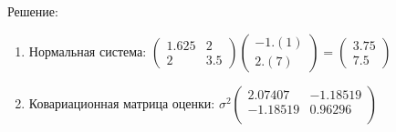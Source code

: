 \documentclass[a4paper,12pt]{article}
\begin{document}
\begin{enumerate}
            Решение:
            \begin{enumerate}
                  \item Нормальная система:
                        $
                              \begin{pmatrix}
                                    1.625 & 2   \\
                                    2     & 3.5
                              \end{pmatrix}
                              \begin{pmatrix}
                                    -1.(1) \\
                                    2.(7)
                              \end{pmatrix}
                              =
                              \begin{pmatrix}
                                    3.75 \\
                                    7.5
                              \end{pmatrix}
                        $

                  \item Ковариационная матрица оценки:
                        $
                              \sigma^2
                              \begin{pmatrix}
                                    2.07407  & -1.18519 \\
                                    -1.18519 & 0.96296  \\
                              \end{pmatrix}
                        $


\end{enumerate}
\end{enumerate}
\end{document}

